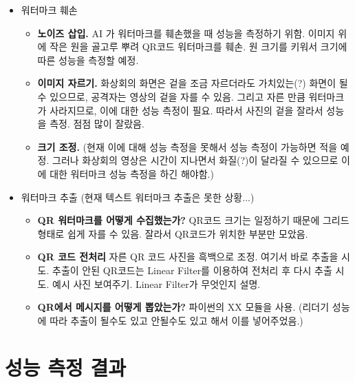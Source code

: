 \begin{itemize}
\begin{itemize}
    \end{itemize}
    \item 워터마크 훼손
    \begin{itemize}
        \item \textbf{노이즈 삽입.} AI 가 워터마크를 훼손했을 때 성능을 측정하기
        위함. 이미지 위에 작은 원을 골고루 뿌려 QR코드 워터마크를 훼손. 원
        크기를 키워서 크기에 따른 성능을 측정할 예정.
        \item \textbf{이미지 자르기.} 화상회의 화면은 겉을 조금 자르더라도
        가치있는(?) 화면이 될 수 있으므로, 공격자는 영상의 겉을 자를 수 있음.
        그리고 자른 만큼 워터마크가 사라지므로, 이에 대한 성능 측정이 필요.
        따라서 사진의 겉을 잘라서 성능을 측정. 점점 많이 잘랐음.
        \item \textbf{크기 조정.} (현재 이에 대해 성능 측정을 못해서 성능 측정이
        가능하면 적을 예정. 그러나 화상회의 영상은 시간이 지나면서 화질(?)이
        달라질 수 있으므로 이에 대한 워터마크 성능 측정을 하긴 해야함.)
    \end{itemize}
    \item 워터마크 추출 (현재 텍스트 워터마크 추출은 못한 상황...)
    \begin{itemize}
        \item \textbf{QR 워터마크를 어떻게 수집했는가?} QR코드 크기는 일정하기
        때문에 그리드 형태로 쉽게 자를 수 있음. 잘라서 QR코드가 위치한 부분만 모았음.
        \item \textbf{QR 코드 전처리} 자른 QR 코드 사진을 흑백으로 조정. 여기서
        바로 추출을 시도. 추출이 안된 QR코드는 Linear Filter를 이용하여 전처리
        후 다시 추출 시도. 예시 사진 보여주기. Linear Filter가 무엇인지 설명.
        \item \textbf{QR에서 메시지를 어떻게 뽑았는가?} 파이썬의 XX 모듈을 사용.
        (리더기 성능에 따라 추출이 될수도 있고 안될수도 있고 해서 이를
        넣어주었음.)
    \end{itemize}
\end{itemize}

\section{성능 측정 결과}

\iffalse
  어떤 내용을 넣을까? 추상적으로.
  - 추출이 잘 되는가?
    - 원본에서 추출이 잘 되는가?
    - 공격 후 추출이 잘 되는가?

  어떤 내용을 넣을까? 자세하게.
  - 

  영상이 손상되는 경우에는 뭐가 있을까?
\fi